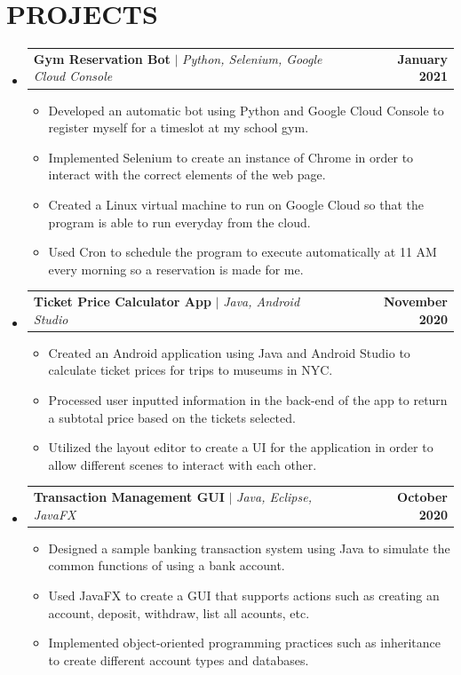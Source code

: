 \documentclass[letterpaper,11pt]{article}
\makeatletter
\newcommand{\resumeItem}[1]{
  \item\small{
    {#1 \vspace{-2pt}}
  }
}
\newcommand{\resumeProjectHeading}[2]{
    \item
    \begin{tabular*}{1.001\textwidth}{l@{\extracolsep{\fill}}r}
      \small#1 & \textbf{\small #2}\\
    \end{tabular*}\vspace{-7pt}
}
\newcommand{\resumeSubHeadingListStart}{\begin{itemize}[leftmargin=0.0in, label={}]}
\newcommand{\resumeSubHeadingListEnd}{\end{itemize}}
\newcommand{\resumeItemListStart}{\begin{itemize}}
\newcommand{\resumeItemListEnd}{\end{itemize}\vspace{-5pt}}
\makeatother
\begin{document}
\section{PROJECTS}
    \vspace{-5pt}
    \resumeSubHeadingListStart
      \resumeProjectHeading
          {\textbf{Gym Reservation Bot} $|$ \emph{Python, Selenium, Google Cloud Console}}{January 2021}
          \resumeItemListStart
            \resumeItem{Developed an automatic bot using Python and Google Cloud Console to register myself for a timeslot at my school gym.}
            \resumeItem{Implemented Selenium to create an instance of Chrome in order to interact with the correct elements of the web page.}
            \resumeItem{Created a Linux virtual machine to run on Google Cloud so that the program is able to run everyday from the cloud.}
            \resumeItem{Used Cron to schedule the program to execute automatically at 11 AM every morning so a reservation is made for me.}
          \resumeItemListEnd
          \vspace{-13pt}
      \resumeProjectHeading
          {\textbf{Ticket Price Calculator App} $|$ \emph{Java, Android Studio}}{November 2020}
          \resumeItemListStart
            \resumeItem{Created an Android application using Java and Android Studio to calculate ticket prices for trips to museums in NYC.}
            \resumeItem{Processed user inputted information in the back-end of the app to return a subtotal price based on the tickets selected.}
            \resumeItem{Utilized the layout editor to create a UI for the application in order to allow different scenes to interact with each other.}
          \resumeItemListEnd
          \vspace{-13pt}
          \resumeProjectHeading
          {\textbf{Transaction Management GUI} $|$ \emph{Java, Eclipse, JavaFX}}{October 2020}
          \resumeItemListStart
            \resumeItem{Designed a sample banking transaction system using Java to simulate the common functions of using a bank account.}
            \resumeItem{Used JavaFX to create a GUI that supports actions such as creating an account, deposit, withdraw, list all acounts, etc.}
            \resumeItem{Implemented object-oriented programming practices such as inheritance to create different account types and databases.}
          \resumeItemListEnd
    \resumeSubHeadingListEnd
\vspace{-15pt}


%
\end{document}

